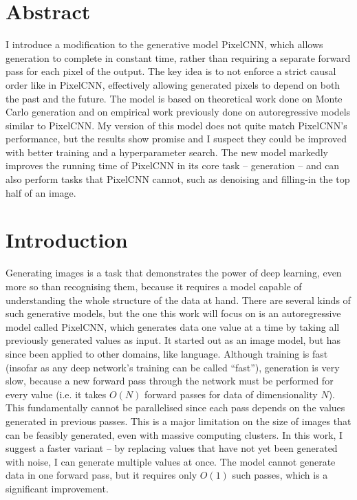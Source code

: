 \documentclass[11pt, a4paper, openany]{book}
\newcommand{\nquote}[1]{``{#1}''}
\begin{document}
\chapter*{Abstract}
\vspace{-1em}
I introduce a modification to the generative model PixelCNN, which allows generation to complete in constant time, rather than requiring a separate forward pass for each pixel of the output. The key idea is to not enforce a strict causal order like in PixelCNN, effectively allowing generated pixels to depend on both the past and the future. The model is based on theoretical work done on Monte Carlo generation and on empirical work previously done on autoregressive models similar to PixelCNN. My version of this model does not quite match PixelCNN's performance, but the results show promise and I suspect they could be improved with better training and a hyperparameter search. The new model markedly improves the running time of PixelCNN in its core task -- generation -- and can also perform tasks that PixelCNN cannot, such as denoising and filling-in the top half of an image.

\pagestyle{headings}
\tableofcontents
\listoffigures
\listoftables

\mainmatter

\chapter{Introduction}
\label{cha:intro}

Generating images is a task that demonstrates the power of deep learning, even more so than recognising them, because it requires a model capable of understanding the whole structure of the data at hand. There are several kinds of such generative models, but the one this work will focus on is an autoregressive model called PixelCNN, which generates data one value at a time by taking all previously generated values as input. It started out as an image model, but has since been applied to other domains, like language. Although training is fast (insofar as any deep network's training can be called \nquote{fast}), generation is very slow, because a new forward pass through the network must be performed for every value (i.e. it takes $O(N)$ forward passes for data of dimensionality $N$). This fundamentally cannot be parallelised since each pass depends on the values generated in previous passes. This is a major limitation on the size of images that can be feasibly generated, even with massive computing clusters. In this work, I suggest a faster variant -- by replacing values that have not yet been generated with noise, I can generate multiple values at once. The model cannot generate data in one forward pass, but it requires only $O(1)$ such passes, which is a significant improvement.
\end{document}
